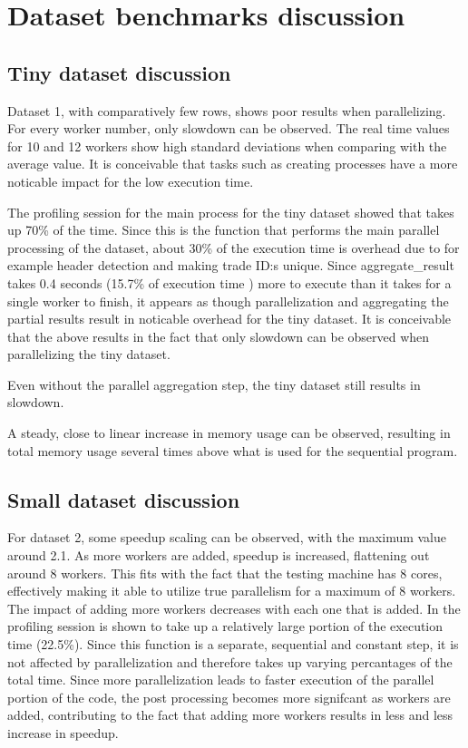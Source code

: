 \section{Dataset benchmarks discussion}
\subsection{Tiny dataset discussion}
Dataset 1, with comparatively few rows, shows poor results when parallelizing. For every worker number, only slowdown can be observed.
The real time values for 10 and 12 workers show high standard deviations when comparing with the average value. It is conceivable that
tasks such as creating processes have a more noticable impact for the low execution time.

The profiling session for the main process for the tiny dataset showed that  takes up 70\% of the time. Since this is the function
that performs the main parallel processing of the dataset, about 30\% of the execution time is overhead due to for example header detection
and making trade ID:s unique. Since aggregate\_result takes 0.4 seconds (15.7\% of execution time ) more to execute than it takes for a single worker to finish,
it appears as though parallelization and aggregating the partial results result in noticable overhead for the tiny dataset.
It is conceivable that the above results in the fact that only slowdown can be observed when parallelizing the tiny dataset.

Even without the parallel aggregation step, the tiny dataset still results in slowdown.

A steady, close to linear increase in memory usage can be observed, resulting in total memory usage several times above what is
used for the sequential program.

\subsection{Small dataset discussion}
For dataset 2, some speedup scaling can be observed, with the maximum value around 2.1. As more workers are added, speedup is increased,
flattening out around 8 workers. This fits with the fact that the testing machine has 8 cores, effectively making it able to utilize 
true parallelism for a maximum of 8 workers. The impact of adding more workers decreases with each one that is added. In the profiling session
 is shown to take up a relatively large portion of the execution time (22.5\%). Since this function is a separate,
sequential and constant step, it is not affected by parallelization and therefore takes up varying percantages of the total time. Since more parallelization
leads to faster execution of the parallel portion of the code, the post processing becomes more signifcant as workers are added, contributing to the fact
that adding more workers results in less and less increase in speedup.

